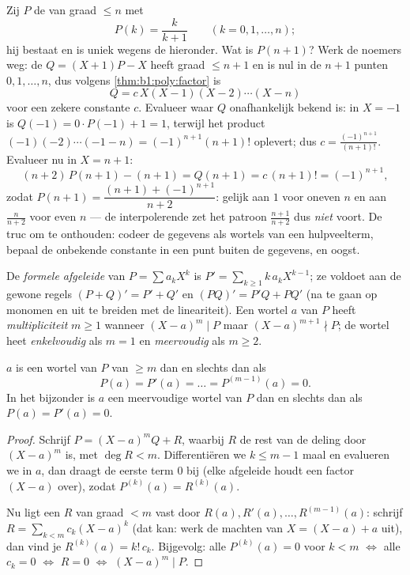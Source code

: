 \begin{example}\label{ex:b1:poly:auxiliary}
Zij $P$ de  van graad $\leq n$ met
\[
P(k) = \frac{k}{k+1} \qquad (k = 0, 1, \dots, n) ;
\]
hij bestaat en is uniek wegens de  hieronder. Wat is
$P(n+1)$? Werk de noemers weg: de  $Q = (X+1)P - X$ heeft graad
$\leq n + 1$ en is nul in de $n + 1$ punten $0, 1, \dots, n$, dus volgens
\cref{thm:b1:poly:factor} is
\[
Q = c\,X(X-1)(X-2)\cdots(X-n)
\]
voor een zekere constante $c$. Evalueer waar $Q$ onafhankelijk bekend is:
in $X = -1$ is $Q(-1) = 0 \cdot P(-1) + 1 = 1$, terwijl het product
$(-1)(-2)\cdots(-1-n) = (-1)^{n+1}(n+1)!$ oplevert; dus $c =
\frac{(-1)^{n+1}}{(n+1)!}$. Evalueer nu in $X = n + 1$:
\[
(n+2)\,P(n+1) - (n+1) = Q(n+1) = c\,(n+1)! = (-1)^{n+1} ,
\]
zodat $P(n+1) = \dfrac{(n+1) + (-1)^{n+1}}{n+2}$: gelijk aan $1$ voor
oneven $n$ en aan $\frac{n}{n+2}$ voor even $n$ --- de interpolerende
 zet het patroon $\frac{n+1}{n+2}$ dus \emph{niet} voort. De truc
om te onthouden: codeer de gegevens als wortels van een hulpveelterm,
bepaal de onbekende constante in een punt buiten de gegevens, en oogst.
\end{example}

\begin{definition}\label{def:b1:poly:derivative}
De \emph{formele afgeleide} van $P = \sum a_k X^k$ is $P' = \sum_{k \geq
1} k\,a_k X^{k-1}$; ze voldoet aan de gewone regels $(P+Q)' = P' + Q'$ en
$(PQ)' = P'Q + PQ'$ (na te gaan op monomen en uit te breiden met de
lineariteit). Een wortel $a$ van $P$ heeft
\emph{multipliciteit} $m \geq 1$
wanneer $(X-a)^m \mid P$ maar $(X-a)^{m+1} \nmid P$; de wortel heet
\emph{enkelvoudig} als $m = 1$ en \emph{meervoudig} als $m \geq 2$.
\end{definition}

\begin{proposition}\label{prop:b1:poly:multiplicity}
$a$ is een wortel van $P$ van  $\geq m$ dan en slechts dan
als
\[
P(a) = P'(a) = \dots = P^{(m-1)}(a) = 0 .
\]
In het bijzonder is $a$ een meervoudige wortel van $P$ dan en slechts dan
als $P(a) = P'(a) = 0$.
\end{proposition}

\begin{proof}
Schrijf $P = (X - a)^m Q + R$, waarbij $R$ de rest van de deling door
$(X-a)^m$ is, met $\deg R < m$. Differentiëren we $k \leq m - 1$ maal en
evalueren we in $a$, dan draagt de eerste term $0$ bij (elke afgeleide
houdt een factor $(X-a)$ over), zodat $P^{(k)}(a) = R^{(k)}(a)$.

Nu ligt een  $R$ van graad $< m$ vast door $R(a), R'(a), \dots,
R^{(m-1)}(a)$: schrijf $R = \sum_{k < m} c_k (X - a)^k$ (dat kan: werk de
machten van $X = (X - a) + a$ uit), dan vind je $R^{(k)}(a) = k!\, c_k$.
Bijgevolg: alle $P^{(k)}(a) = 0$ voor $k < m$ $\iff$ alle $c_k = 0$
$\iff$ $R = 0$ $\iff$ $(X-a)^m \mid P$.
\end{proof}

